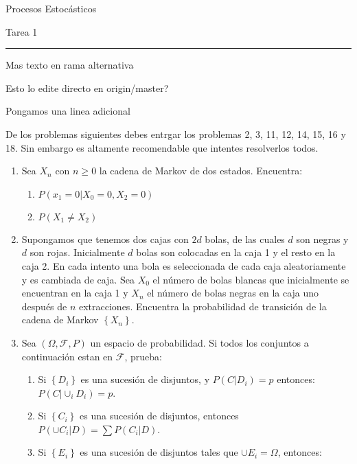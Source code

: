 \documentclass{report}
\begin{document}
\begin{center}
    \textsf{\Large Procesos Estocásticos}
    \par\medskip
    \textsf{\large Tarea 1}
\end{center}
\hrule
\par\bigskip
	Mas texto en rama alternativa

    Esto lo edite directo en origin/master?
	
Pongamos una linea adicional

De los problemas siguientes debes entrgar los problemas 2, 3, 11, 12, 14, 15, 16 y 18. Sin embargo es altamente recomendable que intentes resolverlos todos.
\begin{enumerate}
    \item Sea $X_n$ con $n\geq 0$ la cadena de Markov de dos estados. Encuentra:
          \begin{enumerate}
              \item $P\left(\left. x_1=0\right\vert X_0=0, X_2=0\right)$
              \item $P\left(X_1\neq X_2\right)$
          \end{enumerate}
    \item Supongamos que tenemos dos cajas con $2d$ bolas, de las cuales $d$ son negras y $d$ son rojas. Inicialmente $d$ bolas son colocadas en la caja 1 y el resto en la caja 2. En cada intento una bola es seleccionada de cada caja aleatoriamente y es cambiada de caja. Sea $X_0$ el número de bolas blancas que inicialmente se encuentran en la caja 1 y $X_n$ el número de bolas negras en la caja uno después de $n$ extracciones. Encuentra la probabilidad de transición de la cadena de Markov $\left\{X_n\right\}$.
    \item Sea $\left(\Omega, \mathcal{F}, P\right)$ un espacio de probabilidad. Si todos los conjuntos a continuación estan en $\mathcal{F}$, prueba:
          \begin{enumerate}
              \item Si $\left\{D_i\right\}$ es una sucesión de disjuntos, y $P(\left.C\right\vert D_i)=p$ entonces: $P\left(\left. C \right\vert \cup_i D_i\right)=p$.
              \item Si $\left\{C_i\right\}$ es una sucesión de disjuntos, entonces $P\left(\left.\cup C_i\right\vert D\right)= \sum P\left(\left.C_i\right\vert D\right)$.
              \item Si $\left\{E_i\right\}$ es una sucesión de disjuntos tales que $\cup E_i = \Omega$, entonces:
                    $$
$$
\end{enumerate}
\end{enumerate}
\end{document}
